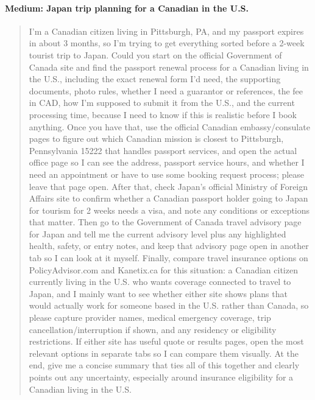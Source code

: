 \documentclass{article}
\theoremstyle{plain}
\theoremstyle{definition}
\theoremstyle{remark}
\begin{document}
\paragraph{Medium: Japan trip planning for a Canadian in the U.S.}
\begin{quote}
\small
I'm a Canadian citizen living in Pittsburgh, PA, and my passport expires in about 3 months, so I'm trying to get everything sorted before a 2-week tourist trip to Japan. Could you start on the official Government of Canada site and find the passport renewal process for a Canadian living in the U.S., including the exact renewal form I'd need, the supporting documents, photo rules, whether I need a guarantor or references, the fee in CAD, how I'm supposed to submit it from the U.S., and the current processing time, because I need to know if this is realistic before I book anything. Once you have that, use the official Canadian embassy/consulate pages to figure out which Canadian mission is closest to Pittsburgh, Pennsylvania 15222 that handles passport services, and open the actual office page so I can see the address, passport service hours, and whether I need an appointment or have to use some booking request process; please leave that page open. After that, check Japan's official Ministry of Foreign Affairs site to confirm whether a Canadian passport holder going to Japan for tourism for 2 weeks needs a visa, and note any conditions or exceptions that matter. Then go to the Government of Canada travel advisory page for Japan and tell me the current advisory level plus any highlighted health, safety, or entry notes, and keep that advisory page open in another tab so I can look at it myself. Finally, compare travel insurance options on PolicyAdvisor.com and Kanetix.ca for this situation: a Canadian citizen currently living in the U.S. who wants coverage connected to travel to Japan, and I mainly want to see whether either site shows plans that would actually work for someone based in the U.S. rather than Canada, so please capture provider names, medical emergency coverage, trip cancellation/interruption if shown, and any residency or eligibility restrictions. If either site has useful quote or results pages, open the most relevant options in separate tabs so I can compare them visually. At the end, give me a concise summary that ties all of this together and clearly points out any uncertainty, especially around insurance eligibility for a Canadian living in the U.S.
\end{quote}
\end{document}
